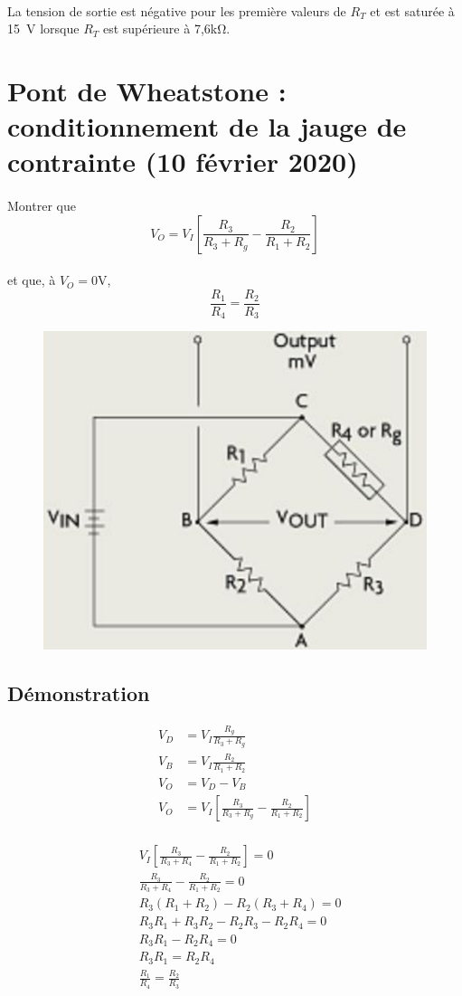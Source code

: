 \documentclass{article}
\begin{document}
\paragraph{}
La tension de sortie est négative pour les première valeurs de $R_T$ et est saturée à \SI{15}{\volt} lorsque $R_T$ est supérieure à 7,6\si{\kilo\ohm}.

\newpage
\section{Pont de Wheatstone : conditionnement de la jauge de contrainte (10 février 2020)}
\paragraph{}
Montrer que
$$V_O = V_I \left[\frac{R_3}{R_3 + R_g} - \frac{R_2}{R_1 + R_2}\right]$$
\paragraph{}
et que, à $V_O = 0\si{\volt}$,
$$\frac{R_1}{R_4} = \frac{R_2}{R_3}$$

\begin{figure}[H]
    \centering
    \includegraphics[width=0.4\linewidth]{./images/wheatstone.png}
\end{figure}

\subsection{Démonstration}
\begin{align*}
    V_D &= V_I\frac{R_g}{R_3 + R_g}\\
    V_B &= V_I\frac{R_2}{R_1 + R_2}\\
    V_O &= V_D - V_B\\
    V_O &= V_I \left[\frac{R_3}{R_3 + R_g} - \frac{R_2}{R_1 + R_2}\right]\\
\end{align*}

\begin{align*}
    &V_I \left[\frac{R_3}{R_3 + R_4} - \frac{R_2}{R_1 + R_2}\right] = 0\\
    &\frac{R_3}{R_3 + R_4} - \frac{R_2}{R_1 + R_2} = 0\\
    &R_3(R_1 + R_2) - R_2(R_3 + R_4) = 0\\
    &R_3R_1 + R_3R_2 - R_2R_3 - R_2R_4 = 0\\
    &R_3R_1 - R_2R_4 = 0\\
    &R_3R_1 = R_2R_4\\
    &\frac{R_1}{R_4} = \frac{R_2}{R_3}\\
\end{align*}
\end{document}
